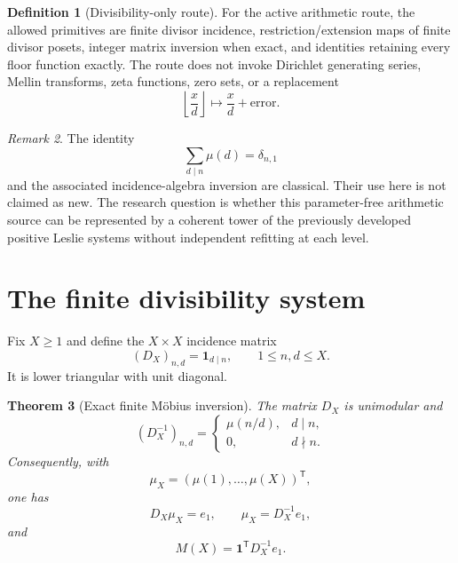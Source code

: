 \documentclass[11pt]{amsart}
\numberwithin{equation}{section}
\theoremstyle{plain}
\newtheorem{theorem}{Theorem}[section]
\theoremstyle{definition}
\newtheorem{definition}[theorem]{Definition}
\theoremstyle{remark}
\newtheorem{remark}[theorem]{Remark}
\begin{document}
\begin{definition}[Divisibility-only route]
\label{def:divisibility_only_route}
For the active arithmetic route, the allowed primitives are finite divisor incidence,
restriction/extension maps of finite divisor posets, integer matrix inversion when exact, and
identities retaining every floor function exactly.  The route does not invoke Dirichlet
generating series, Mellin transforms, zeta functions, zero sets, or a replacement
\[
\left\lfloor\frac xd\right\rfloor\mapsto\frac xd+\text{error}.
\]
\end{definition}

\begin{remark}
\label{rem:classical_origin_declared}
The identity
\[
\sum_{d\mid n}\mu(d)=\delta_{n,1}
\]
and the associated incidence-algebra inversion are classical.  Their use here is not claimed as
new.  The research question is whether this parameter-free arithmetic source can be represented
by a coherent tower of the previously developed positive Leslie systems without independent
refitting at each level.
\end{remark}


\section{The finite divisibility system}
\label{sec:finite_divisibility_system}

Fix $X\ge1$ and define the $X\times X$ incidence matrix
\begin{equation}
(D_X)_{n,d}=\mathbf 1_{d\mid n},
\qquad 1\le n,d\le X.
\label{eq:divisibility_matrix}
\end{equation}
It is lower triangular with unit diagonal.

\begin{theorem}[Exact finite M\"obius inversion]
\label{thm:finite_mobius_inversion}
The matrix $D_X$ is unimodular and
\begin{equation}
(D_X^{-1})_{n,d}
=
\begin{cases}
\mu(n/d),&d\mid n,\\
0,&d\nmid n.
\end{cases}
\label{eq:divisibility_inverse}
\end{equation}
Consequently, with
\[
\mu_X=(\mu(1),\ldots,\mu(X))^{\mathsf T},
\]
one has
\begin{equation}
D_X\mu_X=e_1,
\qquad
\mu_X=D_X^{-1}e_1,
\label{eq:Dmu_e1}
\end{equation}
and
\begin{equation}
M(X)=\mathbf 1^{\mathsf T}D_X^{-1}e_1.
\label{eq:M_as_incidence_observable}
\end{equation}
\end{theorem}
\end{document}
